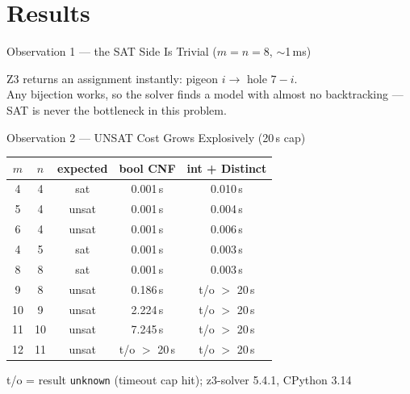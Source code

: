 \documentclass[10pt,aspectratio=169,xcolor={table}]{beamer}
\begin{document}
\section{Results}

\begin{frame}{Observation 1 --- the SAT Side Is Trivial ($m=n=8$, $\sim$1\,ms)}
  \centering

  \medskip
  {\small Z3 returns an assignment instantly: pigeon $i \to$ hole $7-i$.\\
   Any bijection works, so the solver finds a model with almost no
   backtracking --- SAT is never the bottleneck in this problem.}
\end{frame}

\begin{frame}{Observation 2 --- UNSAT Cost Grows Explosively (20\,s cap)}
  \centering
  \footnotesize
  \begin{tabular}{cc c cc}
    \toprule
    $m$ & $n$ & expected & bool CNF & int + Distinct \\
    \midrule
    4  & 4  & sat   & 0.001\,s      & 0.010\,s      \\
    5  & 4  & unsat & 0.001\,s      & 0.004\,s      \\
    6  & 4  & unsat & 0.001\,s      & 0.006\,s      \\
    4  & 5  & sat   & 0.001\,s      & 0.003\,s      \\
    8  & 8  & sat   & 0.001\,s      & 0.003\,s      \\
    \rowcolor{red!8} 9  & 8  & unsat & 0.186\,s      & t/o $>$ 20\,s \\
    \rowcolor{red!8} 10 & 9  & unsat & 2.224\,s      & t/o $>$ 20\,s \\
    \rowcolor{red!8} 11 & 10 & unsat & 7.245\,s      & t/o $>$ 20\,s \\
    \rowcolor{red!8} 12 & 11 & unsat & t/o $>$ 20\,s & t/o $>$ 20\,s \\
    \bottomrule
  \end{tabular}

  \medskip
  {\scriptsize t/o = result \texttt{unknown} (timeout cap hit); z3-solver 5.4.1, CPython 3.14}
\end{frame}
\end{document}
